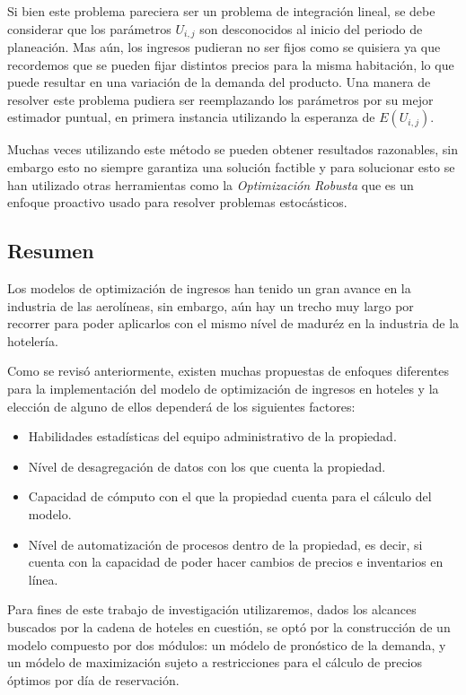 {{{{{Si bien este problema pareciera ser un problema de integración lineal, se debe considerar que los parámetros $U_{i,j}$ son desconocidos al inicio del periodo de planeación. Mas aún, los ingresos pudieran no ser fijos como se quisiera ya que recordemos que se pueden fijar distintos precios para la misma habitación, lo que puede resultar en una variación de la demanda del producto. Una manera de resolver este problema pudiera ser reemplazando los parámetros por su mejor estimador puntual, en primera instancia utilizando la esperanza de $E(U_{i,j})$.

Muchas veces utilizando este método se pueden obtener resultados razonables, sin embargo esto no siempre garantiza una solución factible y para solucionar esto se han utilizado otras herramientas como la \emph{Optimización Robusta} que es un enfoque proactivo usado para resolver problemas estocásticos.

\subsection*{Resumen}

Los modelos de optimización de ingresos han tenido un gran avance en la industria de las aerolíneas, sin embargo, aún hay un trecho muy largo por recorrer para poder aplicarlos con el mismo nível de maduréz en la industria de la hotelería.

Como se revisó anteriormente, existen muchas propuestas de enfoques diferentes para la implementación del modelo de optimización de ingresos en hoteles y la elección de alguno de ellos dependerá de los siguientes factores:
\begin{itemize}
  \item Habilidades estadísticas del equipo administrativo de la propiedad.
  \item Nível de desagregación de datos con los que cuenta la propiedad.
  \item Capacidad de cómputo con el que la propiedad cuenta para el cálculo del modelo.
  \item Nível de automatización de procesos dentro de la propiedad, es decir, si cuenta con la capacidad de poder hacer cambios de precios e inventarios en línea.
\end{itemize}

Para fines de este trabajo de investigación utilizaremos, dados los alcances buscados por la cadena de hoteles en cuestión, se optó por la construcción de un modelo  compuesto por dos módulos: un módelo de pronóstico de la demanda, y un módelo de maximización sujeto a restricciones para el cálculo de precios óptimos por día de reservación.

}}}}}
